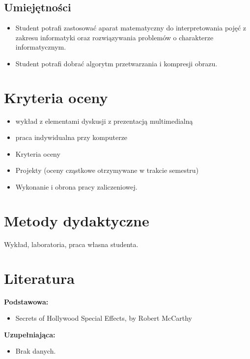 \documentclass[12pt, a4paper]{article}
\begin{document}
\subsection*{Umiejętności}
\begin{itemize}
  \item Student potrafi  zastosować aparat matematyczny do interpretowania pojęć z zakresu informatyki oraz rozwiązywania problemów o charakterze informatycznym.
  \item Student potrafi  dobrać algorytm przetwarzania i kompresji obrazu.
\end{itemize}

\section{Kryteria oceny}

\begin{itemize}
  \item wykład z elementami dyskusji z prezentacją multimedialną
  \item praca indywidualna przy komputerze
  \item Kryteria oceny
  \item Projekty (oceny cząstkowe otrzymywane w trakcie semestru)
  \item Wykonanie i obrona pracy zaliczeniowej.
\end{itemize}

\section{Metody dydaktyczne}

Wykład, laboratoria, praca własna studenta.

\section{Literatura}

\textbf{Podstawowa:}
\begin{itemize}
  \item Secrets of Hollywood Special Effects, by Robert McCarthy
\end{itemize}

\textbf{Uzupełniająca:}
\begin{itemize}
  \item Brak danych.
\end{itemize}
\end{document}
